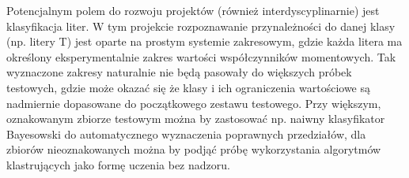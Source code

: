 \documentclass[11pt,a4paper]{article} %
\numberwithin{equation}{section} %
\numberwithin{figure}{section} %
\numberwithin{table}{section} %
\begin{document}
Potencjalnym polem do rozwoju projektów (również interdyscyplinarnie) jest klasyfikacja liter. W tym projekcie rozpoznawanie przynależności do danej klasy (np. litery T) jest oparte na prostym systemie zakresowym, gdzie każda litera ma określony eksperymentalnie zakres wartości współczynników momentowych. Tak wyznaczone zakresy naturalnie nie będą pasowały do większych próbek testowych, gdzie może okazać się że klasy i ich ograniczenia wartościowe są nadmiernie dopasowane do początkowego zestawu testowego. Przy większym, oznakowanym zbiorze testowym można by zastosować np. naiwny klasyfikator Bayesowski do automatycznego wyznaczenia poprawnych przedziałów, dla zbiorów nieoznakowanych można by podjąć próbę wykorzystania algorytmów klastrujących jako formę uczenia bez nadzoru.
\end{document}
